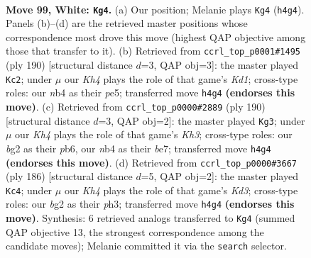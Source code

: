 \documentclass[11pt]{article}
\begin{document}
\clearpage

\begin{figure}[p]\centering
\begin{subfigure}{0.46\textwidth}\centering
\resizebox{\linewidth}{!}{%
\newchessgame
\chessboard[
  setfen={8/7k/8/8/1n1B3K/8/5Pb1/8 w - - 43 99},
  showmover=false,
  pgfstyle=straightmove, color=movearrow, markmove={h4-g4}
]}
\caption{}
\end{subfigure}\hfill
\begin{subfigure}{0.46\textwidth}\centering
\resizebox{\linewidth}{!}{%
\newchessgame
\chessboard[
  setfen={8/2k5/8/3Bp3/8/4bP2/8/3K4 w - - 13 96},
  showmover=false,
  pgfstyle=straightmove, color=movearrow, markmove={d1-c2}
]}
\caption{}
\end{subfigure}
\\[4pt]
\begin{subfigure}{0.46\textwidth}\centering
\resizebox{\linewidth}{!}{%
\newchessgame
\chessboard[
  setfen={8/4b3/1p6/1P6/2B5/7K/8/6k1 w - - 5 96},
  showmover=false,
  pgfstyle=straightmove, color=movearrow, markmove={h3-g3}
]}
\caption{}
\end{subfigure}\hfill
\begin{subfigure}{0.46\textwidth}\centering
\resizebox{\linewidth}{!}{%
\newchessgame
\chessboard[
  setfen={1k6/8/8/1n6/8/3K3p/7P/6B1 w - - 18 94},
  showmover=false,
  pgfstyle=straightmove, color=movearrow, markmove={d3-c4}
]}
\caption{}
\end{subfigure}
\caption{\textbf{Move 99, White: \texttt{Kg4}.} (a) Our position; Melanie plays \texttt{Kg4} (\texttt{h4g4}). Panels (b)--(d) are the retrieved master positions whose correspondence most drove this move (highest QAP objective among those that transfer to it). (b) Retrieved from \texttt{ccrl\_top\_p0001\#1495} (ply 190) [structural distance $d$=3, QAP obj=3]: the master played \texttt{Kc2}; under $\mu$ our \emph{Kh4} plays the role of that game's \emph{Kd1}; cross-type roles: our \emph{n}b4 as their \emph{p}e5; transferred move \texttt{h4g4} \textbf{(endorses this move)}. (c) Retrieved from \texttt{ccrl\_top\_p0000\#2889} (ply 190) [structural distance $d$=3, QAP obj=2]: the master played \texttt{Kg3}; under $\mu$ our \emph{Kh4} plays the role of that game's \emph{Kh3}; cross-type roles: our \emph{b}g2 as their \emph{p}b6, our \emph{n}b4 as their \emph{b}e7; transferred move \texttt{h4g4} \textbf{(endorses this move)}. (d) Retrieved from \texttt{ccrl\_top\_p0000\#3667} (ply 186) [structural distance $d$=5, QAP obj=2]: the master played \texttt{Kc4}; under $\mu$ our \emph{Kh4} plays the role of that game's \emph{Kd3}; cross-type roles: our \emph{b}g2 as their \emph{p}h3; transferred move \texttt{h4g4} \textbf{(endorses this move)}. Synthesis: 6 retrieved analogs transferred to \texttt{Kg4} (summed QAP objective 13, the strongest correspondence among the candidate moves); Melanie committed it via the \texttt{search} selector.}
\label{fig:thought-m196}
\end{figure}
\end{document}

